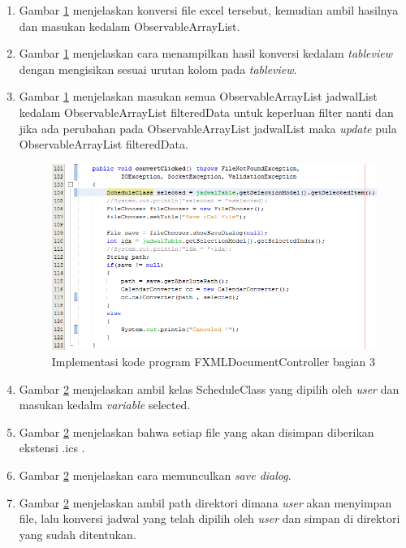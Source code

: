 \begin{enumerate}
\begin{enumerate}
\begin{figure}[H]
		\caption{Implementasi kode program FXMLDocumentController bagian 2}
		\label{fig:controller2}
\end{figure}
	\item Gambar \ref{fig:controller2} menjelaskan konversi file excel tersebut, kemudian ambil hasilnya dan masukan kedalam ObservableArrayList.
	\item Gambar \ref{fig:controller2} menjelaskan cara menampilkan hasil konversi kedalam \textit{tableview} dengan mengisikan sesuai urutan kolom pada \textit{tableview}.
	\item Gambar \ref{fig:controller2} menjelaskan masukan semua ObservableArrayList jadwalList kedalam ObservableArrayList filteredData untuk keperluan filter nanti dan jika ada perubahan pada ObservableArrayList jadwalList maka \textit{update} pula ObservableArrayList filteredData.
	\begin{figure}[H]
		\centering
		\includegraphics[scale=0.7]{Gambar/controller3}
		\caption{Implementasi kode program FXMLDocumentController bagian 3}
		\label{fig:controller3}
\end{figure}
	\item Gambar \ref{fig:controller3} menjelaskan ambil kelas ScheduleClass yang dipilih oleh \textit{user} dan masukan kedalm \textit{variable} selected.
	\item Gambar \ref{fig:controller3} menjelaskan bahwa setiap file yang akan disimpan diberikan ekstensi .ics .
	\item Gambar \ref{fig:controller3} menjelaskan cara memunculkan \textit{save dialog}.
	\item Gambar \ref{fig:controller3} menjelaskan ambil path direktori dimana \textit{user} akan menyimpan file, lalu konversi jadwal yang telah dipilih oleh \textit{user} dan simpan di direktori yang sudah ditentukan.
	\begin{figure}[H]

\end{figure}
\end{enumerate}
\end{enumerate}
